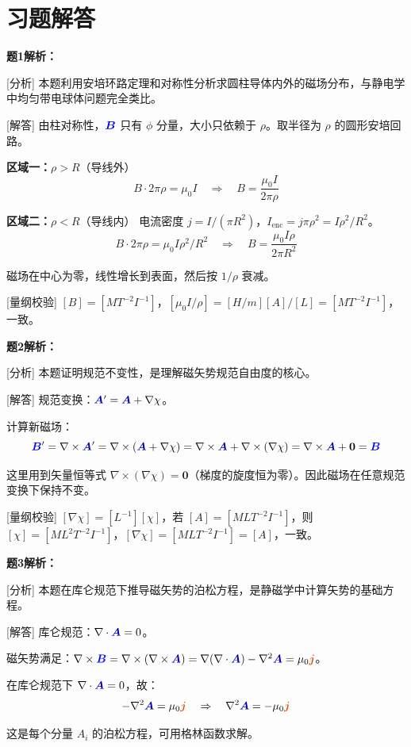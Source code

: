 \documentclass[11pt,a4paper,openany,oneside]{book}
\newcommand{\vecB}{\textcolor{blue}{\vect{B}}}
\newcommand{\vecJ}{\textcolor{cororange}{\vect{j}}}
\newcommand{\vecA}{\textcolor{blue!70!black}{\vect{A}}}
\newcommand{\muz}{\mu_0}
\newcommand{\vect}[1]{\bm{#1}}
\newcommand{\grad}{\nabla}
\newcommand{\curl}{\nabla\times}
\newcommand{\divg}{\nabla\cdot}
\newcommand{\lap}{\nabla^2}
\begin{document}
\section*{习题解答}

\textbf{题1解析：}

[分析] 本题利用安培环路定理和对称性分析求圆柱导体内外的磁场分布，与静电学中均匀带电球体问题完全类比。

[解答] 由柱对称性，$\vecB$ 只有 $\phi$ 分量，大小只依赖于 $\rho$。取半径为 $\rho$ 的圆形安培回路。

\textbf{区域一：$\rho > R$}（导线外）
\[
B \cdot 2\pi\rho = \muz I \quad\Rightarrow\quad B = \frac{\muz I}{2\pi\rho}
\]

\textbf{区域二：$\rho < R$}（导线内）
电流密度 $j = I/(\pi R^2)$，$I_{\text{enc}} = j\pi\rho^2 = I\rho^2/R^2$。
\[
B \cdot 2\pi\rho = \muz I\rho^2/R^2 \quad\Rightarrow\quad B = \frac{\muz I\rho}{2\pi R^2}
\]

磁场在中心为零，线性增长到表面，然后按 $1/\rho$ 衰减。\qedsymbol

[量纲校验] $[B] = [MT^{-2}I^{-1}]$，$[\muz I/\rho] = [H/m][A]/[L] = [MT^{-2}I^{-1}]$，一致。\qedsymbol

\textbf{题2解析：}

[分析] 本题证明规范不变性，是理解磁矢势规范自由度的核心。

[解答] 规范变换：$\vecA' = \vecA + \grad\chi$。

计算新磁场：
\[
\vecB' = \curl\vecA' = \curl(\vecA + \grad\chi) = \curl\vecA + \curl(\grad\chi) = \curl\vecA + \vect{0} = \vecB
\]

这里用到矢量恒等式 $\curl(\grad\chi) = \vect{0}$（梯度的旋度恒为零）。因此磁场在任意规范变换下保持不变。\qedsymbol

[量纲校验] $[\grad\chi] = [L^{-1}][\chi]$，若 $[A] = [MLT^{-2}I^{-1}]$，则 $[\chi] = [ML^2T^{-2}I^{-1}]$，$[\grad\chi] = [MLT^{-2}I^{-1}] = [A]$，一致。\qedsymbol

\textbf{题3解析：}

[分析] 本题在库仑规范下推导磁矢势的泊松方程，是静磁学中计算矢势的基础方程。

[解答] 库仑规范：$\divg\vecA = 0$。

磁矢势满足：$\curl\vecB = \curl(\curl\vecA) = \grad(\divg\vecA) - \lap\vecA = \muz\vecJ$。

在库仑规范下 $\divg\vecA = 0$，故：
\[
-\lap\vecA = \muz\vecJ \quad\Rightarrow\quad \lap\vecA = -\muz\vecJ
\]

这是每个分量 $A_i$ 的泊松方程，可用格林函数求解。\qedsymbol
\end{document}
